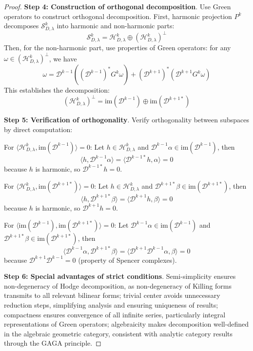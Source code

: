 \documentclass[a4paper,12pt]{extarticle}
\theoremstyle{definition}
\begin{document}
\begin{proof}
\textbf{Step 4: Construction of orthogonal decomposition}. Use Green operators to construct orthogonal decomposition. First, harmonic projection $P^k$ decomposes $\mathcal{S}^k_{D,\lambda}$ into harmonic and non-harmonic parts:
$$\mathcal{S}^k_{D,\lambda} = \mathcal{H}^k_{D,\lambda} \oplus (\mathcal{H}^k_{D,\lambda})^{\perp}$$
Then, for the non-harmonic part, use properties of Green operators: for any $\omega \in (\mathcal{H}^k_{D,\lambda})^{\perp}$, we have
$$\omega = \mathcal{D}^{k-1}((\mathcal{D}^{k-1})^* G^k \omega) + (\mathcal{D}^{k+1})^*(\mathcal{D}^{k+1} G^k \omega)$$
This establishes the decomposition:
$$(\mathcal{H}^k_{D,\lambda})^{\perp} = \mathrm{im}(\mathcal{D}^{k-1}) \oplus \mathrm{im}(\mathcal{D}^{k+1*})$$

\textbf{Step 5: Verification of orthogonality}. Verify orthogonality between subspaces by direct computation:

For $\langle \mathcal{H}^k_{D,\lambda}, \mathrm{im}(\mathcal{D}^{k-1}) \rangle = 0$: Let $h \in \mathcal{H}^k_{D,\lambda}$ and $\mathcal{D}^{k-1}\alpha \in \mathrm{im}(\mathcal{D}^{k-1})$, then
$$\langle h, \mathcal{D}^{k-1}\alpha \rangle = \langle \mathcal{D}^{k-1*}h, \alpha \rangle = 0$$
because $h$ is harmonic, so $\mathcal{D}^{k-1*}h = 0$.

For $\langle \mathcal{H}^k_{D,\lambda}, \mathrm{im}(\mathcal{D}^{k+1*}) \rangle = 0$: Let $h \in \mathcal{H}^k_{D,\lambda}$ and $\mathcal{D}^{k+1*}\beta \in \mathrm{im}(\mathcal{D}^{k+1*})$, then
$$\langle h, \mathcal{D}^{k+1*}\beta \rangle = \langle \mathcal{D}^{k+1}h, \beta \rangle = 0$$
because $h$ is harmonic, so $\mathcal{D}^{k+1}h = 0$.

For $\langle \mathrm{im}(\mathcal{D}^{k-1}), \mathrm{im}(\mathcal{D}^{k+1*}) \rangle = 0$: Let $\mathcal{D}^{k-1}\alpha \in \mathrm{im}(\mathcal{D}^{k-1})$ and $\mathcal{D}^{k+1*}\beta \in \mathrm{im}(\mathcal{D}^{k+1*})$, then
$$\langle \mathcal{D}^{k-1}\alpha, \mathcal{D}^{k+1*}\beta \rangle = \langle \mathcal{D}^{k+1}\mathcal{D}^{k-1}\alpha, \beta \rangle = 0$$
because $\mathcal{D}^{k+1}\mathcal{D}^{k-1} = 0$ (property of Spencer complexes).

\textbf{Step 6: Special advantages of strict conditions}. Semi-simplicity ensures non-degeneracy of Hodge decomposition, as non-degeneracy of Killing forms transmits to all relevant bilinear forms; trivial center avoids unnecessary reduction steps, simplifying analysis and ensuring uniqueness of results; compactness ensures convergence of all infinite series, particularly integral representations of Green operators; algebraicity makes decomposition well-defined in the algebraic geometric category, consistent with analytic category results through the GAGA principle.
\end{proof}
\end{document}
